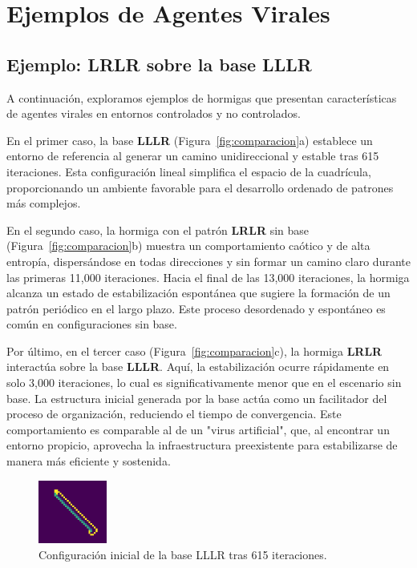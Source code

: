 \documentclass[twocolumn]{article}
\begin{document}
\section{Ejemplos de Agentes Virales}

\subsection{Ejemplo: LRLR sobre la base LLLR}

A continuación, exploramos ejemplos de hormigas que presentan características de agentes virales en entornos controlados y no controlados.

En el primer caso, la base \textbf{LLLR} (Figura~\ref{fig:comparacion}a) establece un entorno de referencia al generar un camino unidireccional y estable tras 615 iteraciones. Esta configuración lineal simplifica el espacio de la cuadrícula, proporcionando un ambiente favorable para el desarrollo ordenado de patrones más complejos.

En el segundo caso, la hormiga con el patrón \textbf{LRLR} sin base (Figura~\ref{fig:comparacion}b) muestra un comportamiento caótico y de alta entropía, dispersándose en todas direcciones y sin formar un camino claro durante las primeras 11,000 iteraciones. Hacia el final de las 13,000 iteraciones, la hormiga alcanza un estado de estabilización espontánea que sugiere la formación de un patrón periódico en el largo plazo. Este proceso desordenado y espontáneo es común en configuraciones sin base.

Por último, en el tercer caso (Figura~\ref{fig:comparacion}c), la hormiga \textbf{LRLR} interactúa sobre la base \textbf{LLLR}. Aquí, la estabilización ocurre rápidamente en solo 3,000 iteraciones, lo cual es significativamente menor que en el escenario sin base. La estructura inicial generada por la base actúa como un facilitador del proceso de organización, reduciendo el tiempo de convergencia. Este comportamiento es comparable al de un "virus artificial", que, al encontrar un entorno propicio, aprovecha la infraestructura preexistente para estabilizarse de manera más eficiente y sostenida.
\begin{figure}[h!]
    \centering
    \includegraphics[width=0.2\textwidth]{reportTemplate/figures/lllr_615.png}
    \caption{Configuración inicial de la base LLLR tras 615 iteraciones.}
    \label{fig:lllr_615}
\end{figure}
\end{document}
